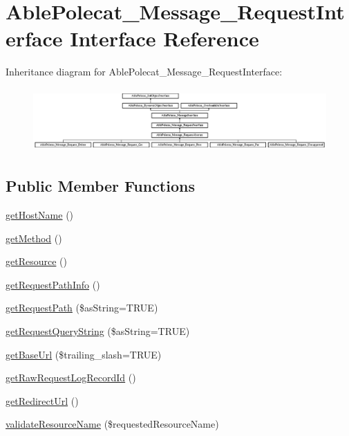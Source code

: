 \hypertarget{interface_able_polecat___message___request_interface}{}\section{Able\+Polecat\+\_\+\+Message\+\_\+\+Request\+Interface Interface Reference}
\label{interface_able_polecat___message___request_interface}
Inheritance diagram for Able\+Polecat\+\_\+\+Message\+\_\+\+Request\+Interface\+:\begin{figure}[H]
\begin{center}
\leavevmode
\includegraphics[height=2.443636cm]{interface_able_polecat___message___request_interface}
\end{center}
\end{figure}
\subsection*{Public Member Functions}
\begin{DoxyCompactItemize}
\item 
\hyperlink{interface_able_polecat___message___request_interface_ae78e05faf338016b4c1baeae80316a12}{get\+Host\+Name} ()
\item 
\hyperlink{interface_able_polecat___message___request_interface_af3e37e1a6ed9b8c87f86f659873a83b7}{get\+Method} ()
\item 
\hyperlink{interface_able_polecat___message___request_interface_a8c5a689e9be7d35d0d01d0194637a7d2}{get\+Resource} ()
\item 
\hyperlink{interface_able_polecat___message___request_interface_a24f01da16b0dd5c8443a359fc63ad6a2}{get\+Request\+Path\+Info} ()
\item 
\hyperlink{interface_able_polecat___message___request_interface_a271cb279757d7442621be8d9cc655456}{get\+Request\+Path} (\$as\+String=T\+R\+U\+E)
\item 
\hyperlink{interface_able_polecat___message___request_interface_a857d46fb7d0a91198f2fdc173f65cf75}{get\+Request\+Query\+String} (\$as\+String=T\+R\+U\+E)
\item 
\hyperlink{interface_able_polecat___message___request_interface_a29afed20445af05cf3ef1c9e63a11c22}{get\+Base\+Url} (\$trailing\+\_\+slash=T\+R\+U\+E)
\item 
\hyperlink{interface_able_polecat___message___request_interface_a22300f7ad45068a4ab569ba6d1a6c605}{get\+Raw\+Request\+Log\+Record\+Id} ()
\item 
\hyperlink{interface_able_polecat___message___request_interface_a320f8cf6bf704c301b24f83e4d0c3a22}{get\+Redirect\+Url} ()
\item 
\hyperlink{interface_able_polecat___message___request_interface_a1e05d92c1527e5fbe83db15156e54457}{validate\+Resource\+Name} (\$requested\+Resource\+Name)
\end{DoxyCompactItemize}
